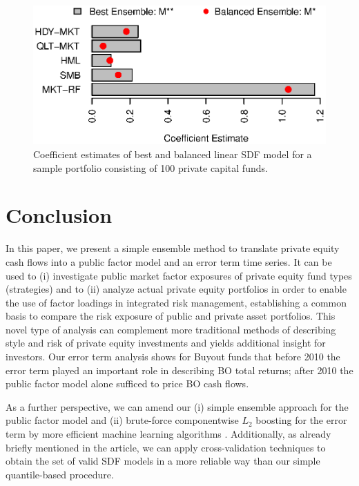 \documentclass[12pt]{article}
\begin{document}
\begin{figure}[H]
	\centering
	\includegraphics{Figures/Coefs100Pofo}
	\caption{Coefficient estimates of best and balanced linear SDF model for a sample portfolio consisting of 100 private capital funds.}
	\label{fig:coef_barchart_100_pofo}
\end{figure}



\section{Conclusion}
\label{sec:conclusion}

In this paper, we present a simple ensemble method to translate private equity cash flows into a public factor model and an error term time series. 
It can be used to (i) investigate public market factor exposures of private equity fund types (strategies) and to (ii) analyze actual private equity portfolios in order to enable the use of factor loadings in integrated risk management, establishing a common basis to compare the risk exposure of public and private asset portfolios. 
This novel type of analysis can complement more traditional methods of describing style and risk of private equity investments and yields additional insight for investors.
Our error term analysis shows for Buyout funds that before 2010 the error term played an important role in describing BO total returns; after 2010 the public factor model alone sufficed to price BO cash flows.
 
As a further perspective, we can amend our (i) simple ensemble approach for the public factor model and (ii) brute-force componentwise $L_2$ boosting for the error term by more efficient machine learning algorithms \citep{B12}.
Additionally, as already briefly mentioned in the article, we can apply cross-validation techniques to obtain the set of valid SDF models in a more reliable way than our simple quantile-based procedure.






\end{document}
